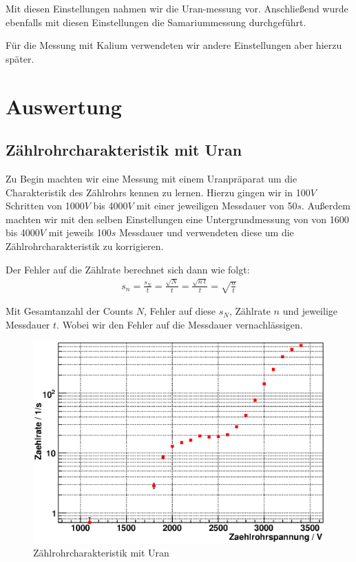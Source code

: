 \documentclass[12pt]{article}
\begin{document}
Mit diesen Einstellungen nahmen wir die Uran-messung vor.
Anschließend wurde ebenfalls mit diesen Einstellungen die Samariummessung durchgeführt.

Für die Messung mit Kalium verwendeten wir andere Einstellungen aber hierzu später.

\section{Auswertung}
\subsection{Zählrohrcharakteristik mit Uran}


Zu Begin machten wir eine Messung mit einem Uranpräparat um die Charakteristik des Zählrohrs kennen zu lernen.
Hierzu gingen wir in 100$V$ Schritten von 1000$V$ bis 4000$V$ mit einer jeweiligen Messdauer von 50$s$.
Außerdem machten wir mit den selben Einstellungen eine Untergrundmessung von von 1600 bis 4000$V$ mit jeweils 100$s$
Messdauer und verwendeten diese um die Zählrohrcharakteristik zu korrigieren.

Der Fehler auf die Zählrate berechnet sich dann wie folgt:
\begin{align}
 s_n = \frac{s_N}{t} = \frac{\sqrt{N}}{t} = \frac{\sqrt{n~t}}{t} = \sqrt{\frac{n}{t}}
\end{align}

Mit Gesamtanzahl der Counts $N$, Fehler auf diese $s_N$, Zählrate $n$ und jeweilige Messdauer $t$. Wobei wir den Fehler auf die Messdauer
vernachlässigen.


\begin{figure}[H]  
\centering
\includegraphics[width=0.9\linewidth]{pictures/char_uran.eps}
\caption{Zählrohrcharakteristik mit Uran}
\end{figure}
\end{document}
